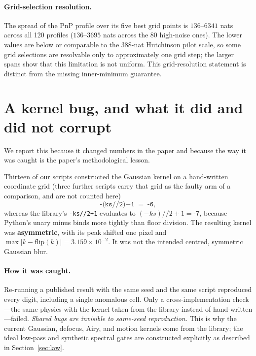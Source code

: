 \documentclass[10pt,journal]{IEEEtran}
\begin{document}
\paragraph*{Grid-selection resolution.}
The spread of the PnP profile over its five best grid points is $136$--$6341$ nats across
all 120 profiles ($136$--$3695$ nats across the 80 high-noise ones). The lower values are below
or comparable to the $388$-nat Hutchinson pilot scale, so some grid selections are resolvable
only to approximately one grid step; the larger spans show that this limitation is not uniform.
This grid-resolution statement is distinct from the missing inner-minimum guarantee.

\section{A kernel bug, and what it did and did not corrupt}
\label{sec:bug}

We report this because it changed numbers in the paper and because the way it was caught is the
paper's methodological lesson.

Thirteen of our scripts constructed the Gaussian kernel on a hand-written coordinate grid
(three further scripts carry that grid as the faulty arm of a comparison, and
are not counted here)
\begin{equation}
  \texttt{-(ks//2)+1} \;=\; \texttt{-6},
\end{equation}
whereas the library's \texttt{-ks//2+1} evaluates to $(-ks)//2+1=\texttt{-7}$, because Python's
unary minus binds more tightly than floor division. The resulting kernel was
\textbf{asymmetric}, with its peak shifted one pixel and
$\max|k-\mathrm{flip}(k)|=3.159\times10^{-2}$. It was not the intended centred, symmetric
Gaussian blur.

\paragraph*{How it was caught.}
Re-running a published result with the same seed and the same script reproduced every digit,
including a single anomalous cell. Only a cross-implementation check---the same physics with
the kernel taken from the library instead of hand-written---failed. \emph{Shared bugs are
invisible to same-seed reproduction.} This is why the current Gaussian, defocus, Airy, and
motion kernels come from the library; the ideal low-pass and synthetic spectral gates are
constructed explicitly as described in Section~\ref{sec:law}.
\end{document}
